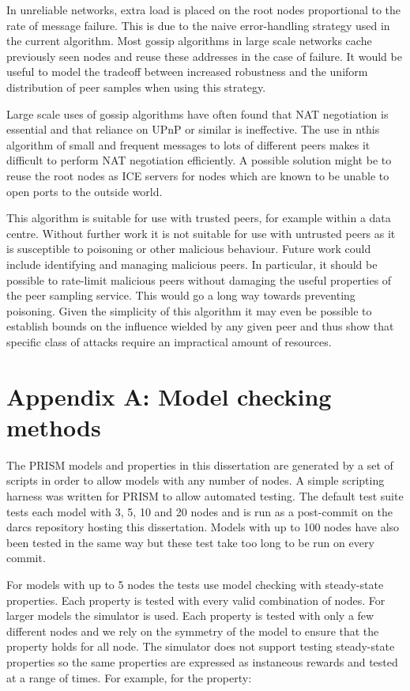 \documentclass[a4paper,10pt]{article}
\begin{document}
In unreliable networks, extra load is placed on the root nodes proportional to the rate of message failure. This is due to the naive error-handling strategy used in the current algorithm. Most gossip algorithms in large scale networks cache previously seen nodes and reuse these addresses in the case of failure. It would be useful to model the tradeoff between increased robustness and the uniform distribution of peer samples when using this strategy.

Large scale uses of gossip algorithms have often found that NAT negotiation is essential \cite{arrg, tribler} and that reliance on UPnP or similar is ineffective. The use in nthis algorithm of small and frequent messages to lots of different peers makes it difficult to perform NAT negotiation efficiently. A possible solution might be to reuse the root nodes as ICE servers for nodes which are known to be unable to open ports to the outside world.

This algorithm is suitable for use with trusted peers, for example within a data centre. Without further work it is not suitable for use with untrusted peers as it is susceptible to poisoning or other malicious behaviour. Future work could include identifying and managing malicious peers. In particular, it should be possible to rate-limit malicious peers without damaging the useful properties of the peer sampling service. This would go a long way towards preventing poisoning. Given the simplicity of this algorithm it may even be possible to establish bounds on the influence wielded by any given peer and thus show that specific class of attacks require an impractical amount of resources.



\clearpage

\section*{Appendix A: Model checking methods}

The PRISM models and properties in this dissertation are generated by a set of scripts in order to allow models with any number of nodes. A simple scripting harness was written for PRISM to allow automated testing. The default test suite tests each model with 3, 5, 10 and 20 nodes and is run as a post-commit on the darcs repository hosting this dissertation. Models with up to 100 nodes have also been tested in the same way but these test take too long to be run on every commit. 

For models with up to 5 nodes the tests use model checking with steady-state properties. Each property is tested with every valid combination of nodes. For larger models the simulator is used. Each property is tested with only a few different nodes and we rely on the symmetry of the model to ensure that the property holds for all node. The simulator does not support testing steady-state properties so the same properties are expressed as instaneous rewards and tested at a range of times. For example, for the property:
\end{document}
